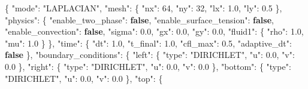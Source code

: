 \documentclass[
  10pt,
]{article}
\newenvironment{Shaded}{}{}
\newcommand{\DataTypeTok}[1]{\textcolor[rgb]{0.56,0.13,0.00}{#1}}
\newcommand{\DecValTok}[1]{\textcolor[rgb]{0.25,0.63,0.44}{#1}}
\newcommand{\FloatTok}[1]{\textcolor[rgb]{0.25,0.63,0.44}{#1}}
\newcommand{\FunctionTok}[1]{\textcolor[rgb]{0.02,0.16,0.49}{#1}}
\newcommand{\KeywordTok}[1]{\textcolor[rgb]{0.00,0.44,0.13}{\textbf{#1}}}
\newcommand{\StringTok}[1]{\textcolor[rgb]{0.25,0.44,0.63}{#1}}
\begin{document}
\begin{Shaded}
\begin{Highlighting}[]
\FunctionTok{\{}
  \DataTypeTok{"mode"}\FunctionTok{:} \StringTok{"LAPLACIAN"}\FunctionTok{,}
  \DataTypeTok{"mesh"}\FunctionTok{:} \FunctionTok{\{}
    \DataTypeTok{"nx"}\FunctionTok{:} \DecValTok{64}\FunctionTok{,}
    \DataTypeTok{"ny"}\FunctionTok{:} \DecValTok{32}\FunctionTok{,}
    \DataTypeTok{"lx"}\FunctionTok{:} \FloatTok{1.0}\FunctionTok{,}
    \DataTypeTok{"ly"}\FunctionTok{:} \FloatTok{0.5}
  \FunctionTok{\},}
  \DataTypeTok{"physics"}\FunctionTok{:} \FunctionTok{\{}
    \DataTypeTok{"enable\_two\_phase"}\FunctionTok{:} \KeywordTok{false}\FunctionTok{,}
    \DataTypeTok{"enable\_surface\_tension"}\FunctionTok{:} \KeywordTok{false}\FunctionTok{,}
    \DataTypeTok{"enable\_convection"}\FunctionTok{:} \KeywordTok{false}\FunctionTok{,}
    \DataTypeTok{"sigma"}\FunctionTok{:} \FloatTok{0.0}\FunctionTok{,}
    \DataTypeTok{"gx"}\FunctionTok{:} \FloatTok{0.0}\FunctionTok{,}
    \DataTypeTok{"gy"}\FunctionTok{:} \FloatTok{0.0}\FunctionTok{,}
    \DataTypeTok{"fluid1"}\FunctionTok{:} \FunctionTok{\{}
      \DataTypeTok{"rho"}\FunctionTok{:} \FloatTok{1.0}\FunctionTok{,}
      \DataTypeTok{"mu"}\FunctionTok{:} \FloatTok{1.0}
    \FunctionTok{\}}
  \FunctionTok{\},}
  \DataTypeTok{"time"}\FunctionTok{:} \FunctionTok{\{}
    \DataTypeTok{"dt"}\FunctionTok{:} \FloatTok{1.0}\FunctionTok{,}
    \DataTypeTok{"t\_final"}\FunctionTok{:} \FloatTok{1.0}\FunctionTok{,}
    \DataTypeTok{"cfl\_max"}\FunctionTok{:} \FloatTok{0.5}\FunctionTok{,}
    \DataTypeTok{"adaptive\_dt"}\FunctionTok{:} \KeywordTok{false}
  \FunctionTok{\},}
  \DataTypeTok{"boundary\_conditions"}\FunctionTok{:} \FunctionTok{\{}
    \DataTypeTok{"left"}\FunctionTok{:} \FunctionTok{\{}
      \DataTypeTok{"type"}\FunctionTok{:} \StringTok{"DIRICHLET"}\FunctionTok{,}
      \DataTypeTok{"u"}\FunctionTok{:} \FloatTok{0.0}\FunctionTok{,}
      \DataTypeTok{"v"}\FunctionTok{:} \FloatTok{0.0}
    \FunctionTok{\},}
    \DataTypeTok{"right"}\FunctionTok{:} \FunctionTok{\{}
      \DataTypeTok{"type"}\FunctionTok{:} \StringTok{"DIRICHLET"}\FunctionTok{,}
      \DataTypeTok{"u"}\FunctionTok{:} \FloatTok{0.0}\FunctionTok{,}
      \DataTypeTok{"v"}\FunctionTok{:} \FloatTok{0.0}
    \FunctionTok{\},}
    \DataTypeTok{"bottom"}\FunctionTok{:} \FunctionTok{\{}
      \DataTypeTok{"type"}\FunctionTok{:} \StringTok{"DIRICHLET"}\FunctionTok{,}
      \DataTypeTok{"u"}\FunctionTok{:} \FloatTok{0.0}\FunctionTok{,}
      \DataTypeTok{"v"}\FunctionTok{:} \FloatTok{0.0}
    \FunctionTok{\},}
    \DataTypeTok{"top"}\FunctionTok{:} \FunctionTok{\{}

\end{Highlighting}
\end{Shaded}
\end{document}
